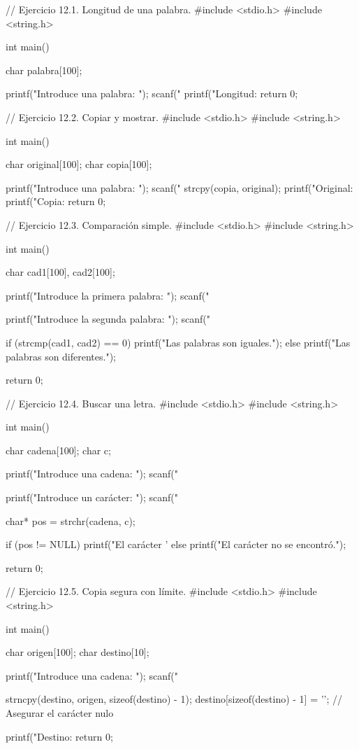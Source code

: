 // Ejercicio 12.1. Longitud de una palabra.
#include <stdio.h>
#include <string.h>

int main() {
   char palabra[100];
   
   printf("Introduce una palabra: ");
   scanf("%
   printf("Longitud: %
   return 0;
}




// Ejercicio 12.2. Copiar y mostrar.
#include <stdio.h>
#include <string.h>

int main() {
   char original[100];
   char copia[100];
   
   printf("Introduce una palabra: ");
   scanf("%
   strcpy(copia, original);
   printf("Original: %
   printf("Copia: %
   return 0;
}



// Ejercicio 12.3. Comparación simple.
#include <stdio.h>
#include <string.h>

int main() {
   char cad1[100], cad2[100];
   
   printf("Introduce la primera palabra: ");
   scanf("%
   
   printf("Introduce la segunda palabra: ");
   scanf("%
   
   if (strcmp(cad1, cad2) == 0) {
      printf("Las palabras son iguales.\n");
   } else {
      printf("Las palabras son diferentes.\n");
   }
   
   return 0;
}


// Ejercicio 12.4. Buscar una letra.
#include <stdio.h>
#include <string.h>

int main() {
   char cadena[100];
   char c;
   
   printf("Introduce una cadena: ");
   scanf("%
   
   printf("Introduce un carácter: ");
   scanf(" %
   
   char* pos = strchr(cadena, c);
   
   if (pos != NULL) {
      printf("El carácter '%
   } else {
      printf("El carácter no se encontró.\n");
   }
   
   return 0;
}


// Ejercicio 12.5. Copia segura con límite.
#include <stdio.h>
#include <string.h>

int main() {
   char origen[100];
   char destino[10];
   
   printf("Introduce una cadena: ");
   scanf("%
   
   strncpy(destino, origen, sizeof(destino) - 1);
   destino[sizeof(destino) - 1] = '\0'; // Asegurar el carácter nulo
   
   printf("Destino: %
   return 0;
}




